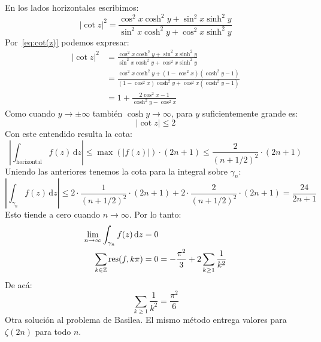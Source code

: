   En los lados horizontales escribimos:
  \begin{equation*}
    \lvert \cot z \rvert^2
      =	 \frac{\cos^2 x \cosh^2 y + \sin^2 x \sinh^2 y}
	      {\sin^2 x \cosh^2 y + \cos^2 x \sinh^2 y}
  \end{equation*}
  Por~\eqref{eq:cot(z)} podemos expresar:
  \begin{align*}
    \lvert \cot z \rvert^2
      &= \frac{\cos^2 x \cosh^2 y + \sin^2 x \sinh^2 y}
	      {\sin^2 x \cosh^2 y + \cos^2 x \sinh^2 y} \\
      &= \frac{\cos^2 x \cosh^2 y + (1 - \cos^2 x) (\cosh^2 y - 1)}
	      {(1 - \cos^2 x) \cosh^2 y
		+ \cos^2 x (\cosh^2 y - 1)} \\
      &= 1 + \frac{2 \cos^2 x - 1}{\cosh^2 y - \cos^2 x}
  \end{align*}
  Como cuando \(y \rightarrow \pm \infty\)
  también \(\cosh y \rightarrow \infty\),
  para \(y\) suficientemente grande es:
  \begin{equation}
    \label{eq:complex-cot-horizontal-bound}
    \lvert \cot z \rvert
      \le 2
  \end{equation}
  Con este entendido resulta la cota:
  \begin{equation*}
    \left\lvert \int_\text{horizontal} f(z) \, \mathrm{d} z \right\rvert
      \le \max(\lvert f(z) \rvert) \cdot (2 n + 1)
      \le \frac{2}{(n + 1/2)^2} \cdot (2 n + 1)
  \end{equation*}
  Uniendo las anteriores
  tenemos la cota para la integral sobre \(\gamma_n\):
  \begin{equation*}
    \left\lvert \int_{\gamma_n} f(z) \, \mathrm{d} z \right\rvert
      \le 2 \cdot \frac{1}{(n  + 1/2)^2} \cdot (2 n + 1)
	   + 2 \cdot \frac{2}{(n + 1/2)^2} \cdot (2 n + 1)
      = \frac{24}{2 n + 1}
  \end{equation*}
  Esto tiende a cero cuando \(n \rightarrow \infty\).
  Por lo tanto:
  \begin{align*}
    \lim_{n \rightarrow \infty} \int_{\gamma_n} f(z) \, \mathrm{d} z
      &= 0 \\
    \sum_{k \in \mathbb{Z}} \operatorname{res}(f, k \pi)
      &= 0
       = - \frac{\pi^2}{3} + 2 \sum_{k \ge 1} \frac{1}{k^2}
  \end{align*}
  De acá:%
  \begin{equation}
    \label{eq:sum-reciprocal-squares}
    \sum_{k \ge 1} \frac{1}{k^2}
      = \frac{\pi^2}{6}
  \end{equation}
  Otra solución al problema de Basilea.
  El mismo método entrega valores
  para \(\zeta(2 n)\) para todo \(n\).

